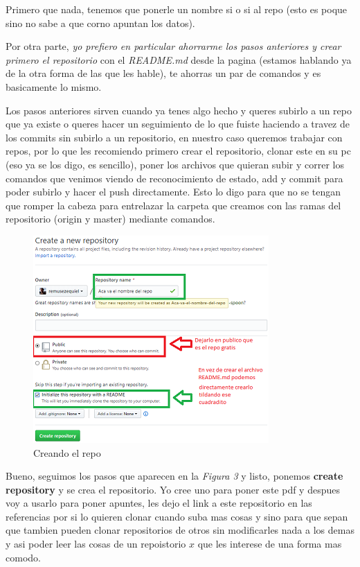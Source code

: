 \documentclass[10pt,journal,compsoc]{IEEEtran}
\begin{document}
 Primero que nada, tenemos que ponerle un nombre si o si al repo (esto es poque sino no sabe a que corno apuntan los datos). 
 
 Por otra parte, \textit{yo prefiero en particular ahorrarme los pasos anteriores y crear primero el repositorio} con el \textit{README.md} desde la pagina (estamos hablando ya de la otra forma de las que les hable), te ahorras un par de comandos y es basicamente lo mismo.
 
  Los pasos anteriores sirven cuando ya tenes algo hecho y queres subirlo a un repo que ya existe o queres hacer un seguimiento de lo que fuiste haciendo a travez de los commits sin subirlo a un repositorio, en nuestro caso queremos trabajar con repos, por lo que les recomiendo primero crear el repositorio, clonar este en su pc (eso ya se los digo, es sencillo), poner los archivos que quieran subir y correr los comandos que venimos viendo de reconocimiento de estado, add y commit para poder subirlo y hacer el push directamente. Esto lo digo para que no se tengan que romper la cabeza para entrelazar la carpeta que creamos con las ramas del repositorio (origin y master) mediante comandos.
  
\begin{figure}[H]
  \begin{center}
	 \includegraphics{figuras/crear.png}
	 \centering
	 \renewcommand{\arraystretch}{1.3}
	 \caption{Creando el repo}
  \end{center}
\end{figure}

Bueno, seguimos los pasos que aparecen en la \textit{Figura 3} y listo, ponemos \textbf{create repository} y se crea el repositorio. Yo cree uno para poner este pdf y despues voy a usarlo para poner apuntes, les dejo el link a este repositorio en las referencias por si lo quieren clonar cuando suba mas cosas y sino para que sepan que tambien pueden clonar repositorios de otros sin modificarles nada a los demas y asi poder leer las cosas de un repoistorio $x$ que les interese de una forma mas comodo.
\end{document}
